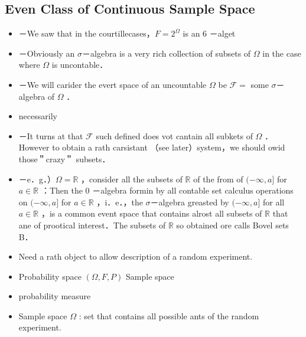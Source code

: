 \subsection{Even Class of Continuous Sample Space}
\begin{itemize}
  \item[] －We saw that in the courtillecases，\(F=2^{\Omega}\) is an 6 －alget
  \item[] －Obviously an \(\sigma\)－algebra is a very rich collection of subsets of \(\Omega\) in the case where \(\Omega\) is uncontable．
  \item[] －We will carider the evert space of an uncountable \(\Omega\) be \(\mathcal{F}=\) some \(\sigma\)－algebra of \(\Omega\) ．
  \item[] necessarily
  \item[] －It turns at that \(\mathcal{F}\) such defined does vot cantain all subkets of \(\Omega\) ．However to obtain a rath carsistant （see later）system，we should owid those＂crazy＂ subsets．
  \item[] －e．g．）\(\Omega=\mathbb{R}\) ，consider all the subsets of \(\mathbb{R}\) of the from of \((-\infty, a]\) for \(a \in \mathbb{R}\) ：Then the 0 －algebra formin by all contable set calculus operations on \((-\infty, a]\) for \(a \in \mathbb{R}\) ，i．e．，the \(\sigma\)－algebra greasted by \((-\infty, a]\) for all \(a \in \mathbb{R}\) ，is a common event space that contains alrost all subsets of \(\mathbb{R}\) that ane of prootical interest．The subsets of \(\mathbb{R}\) so obtained ore calls Bovel sets B．
\end{itemize}
\begin{itemize}
  \item[-] Need a rath object to allow description of a random experiment.
  \item[-] Probability space \((\Omega, F, P)\) Sample space
  \item[] probability measure
  \item[-] Sample space \(\Omega\) : set that contains all possible ants of the random experiment.
\end{itemize}
